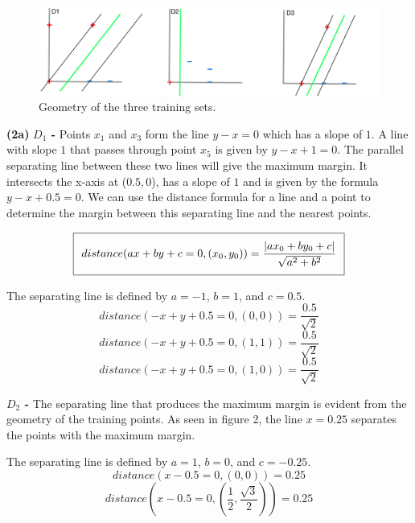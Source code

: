 \documentclass[11pt]{article}
\renewcommand\part[1]{\vspace{.10in}\textbf{(#1)}}
\begin{document}

\begin{figure}[H]
  \centerline{\includegraphics[width=0.8\linewidth]{1_2.png}}
  \caption{Geometry of the three training sets.}
\end{figure}

\part{2a} \textbf{$D_1$ - } Points $x_1$ and $x_3$ form the line $y - x = 0$ which has a slope of $1$. A line with slope $1$ that passes through point $x_5$ is given by $y - x + 1 = 0$. The parallel separating line between these two lines will give the maximum margin. It intersects the x-axis at ($0.5, 0$), has a slope of $1$ and is given by the formula $y - x + 0.5 = 0$. We can use the distance formula for a line and a point to determine the margin between this separating line and the nearest points.

\begin{equation}
\setlength\fboxsep{0.25cm}
\setlength\fboxrule{0.4pt}
\boxed{distance(ax + by + c = 0, (x_0, y_0)) = \frac{|ax_0 + by_0 + c|}{\sqrt{a^2 + b^2}}}
\end{equation} 

The separating line is defined by $a = -1$, $b = 1$, and $c = 0.5$.
$$distance(-x + y + 0.5 = 0, (0, 0)) = \frac{0.5}{\sqrt{2}}$$
$$distance(-x + y + 0.5 = 0, (1, 1)) = \frac{0.5}{\sqrt{2}}$$
$$distance(-x + y + 0.5 = 0, (1, 0)) = \frac{0.5}{\sqrt{2}}$$


\textbf{$D_2$ - } The separating line that produces the maximum margin is evident from the geometry of the training points. As seen in figure 2, the line $x = 0.25$ separates the points with the maximum margin.

The separating line is defined by $a = 1$, $b = 0$, and $c = -0.25$.
$$distance(x - 0.5 = 0, (0, 0)) = 0.25$$
$$distance(x - 0.5 = 0, (\frac{1}{2}, \frac{\sqrt{3}}{2})) = 0.25$$

\end{document}
